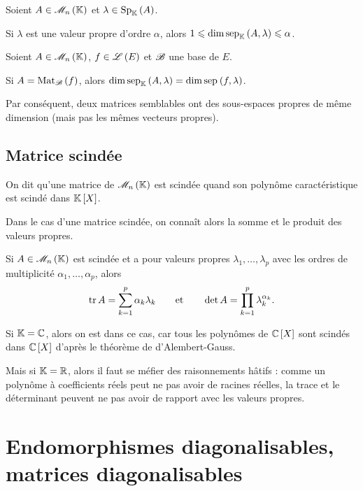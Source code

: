 \begin{theo}
Soient \(A\in\M{n}\) et \(\lambda\in\Sp[\K]{A}\).

Si \(\lambda\) est une valeur propre d'ordre \(\alpha\), alors \(1\leq\dim\sep[\K]{A}{\lambda}\leq\alpha\).
\end{theo}

\begin{prop}
Soient \(A\in\M{n}\), \(f\in\mathscr{L}\left(E\right)\) et \(\mathscr{B}\) une base de \(E\).

Si \(A=\Mat{f}\), alors \(\dim\sep[\K]{A}{\lambda}=\dim\sep{f}{\lambda}\).
\end{prop}

Par conséquent, deux matrices semblables ont des sous-espaces propres de même dimension (mais pas les mêmes vecteurs propres).

\subsection{Matrice scindée}

\begin{defi}
On dit qu'une matrice de \(\M{n}\) est scindée quand son polynôme caractéristique est scindé dans \(\poly\).
\end{defi}

Dans le cas d'une matrice scindée, on connaît alors la somme et le produit des valeurs propres.

\begin{prop}
Si \(A\in\M{n}\) est scindée et a pour valeurs propres \(\lambda_1,\dots,\lambda_p\) avec les ordres de multiplicité \(\alpha_1,\dots,\alpha_p\), alors \[\operatorname{tr} A=\sum_{k=1}^p\alpha_k\lambda_k\qquad\text{et}\qquad\det A=\prod_{k=1}^p\lambda_k^{\alpha_k}.\]
\end{prop}

Si \(\mathbb{K}=\mathbb{C}\), alors on est dans ce cas, car tous les polynômes de \(\poly[\C]\) sont scindés dans \(\poly[\C]\) d'après le théorème de d'Alembert-Gauss.

Mais si \(\mathbb{K}=\mathbb{R}\), alors il faut se méfier des raisonnements hâtifs : comme un polynôme à coefficients réels peut ne pas avoir de racines réelles, la trace et le déterminant peuvent ne pas avoir de rapport avec les valeurs propres.

\section{Endomorphismes diagonalisables, matrices diagonalisables}

